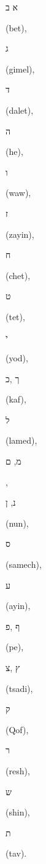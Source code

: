 \documentclass[a4paper,11pt]{article}
\begin{document}
\begin{hebrew} א ב‎ \end{hebrew} (bet), \begin{hebrew} ג‎ \end{hebrew} (gimel),
\begin{hebrew} ד‎ \end{hebrew} (dalet), \begin{hebrew} ה‎ \end{hebrew} (he),
\begin{hebrew} ו‎ \end{hebrew} (waw), \begin{hebrew} ז \end{hebrew} (zayin),
\begin{hebrew} ח \end{hebrew} (chet), \begin{hebrew} ט‎ \end{hebrew} (tet),
\begin{hebrew} י \end{hebrew} (yod), \begin{hebrew} כ‎, ך \end{hebrew} (kaf),
\begin{hebrew} ל‎ \end{hebrew} (lamed), \begin{hebrew} מ, ם \end{hebrew},
\begin{hebrew} נ, ן‎ \end{hebrew} (nun), \begin{hebrew} ס‎ \end{hebrew}
(samech), \begin{hebrew} ע \end{hebrew} (ayin),
\begin{hebrew} פ‎, ף‎ \end{hebrew} (pe), \begin{hebrew} צ‎, ץ \end{hebrew}
(tsadi), \begin{hebrew} ק \end{hebrew} (Qof), \begin{hebrew} ר \end{hebrew}
(resh), \begin{hebrew} ש \end{hebrew} (shin), \begin{hebrew} ת \end{hebrew}
(tav).
\end{document}
